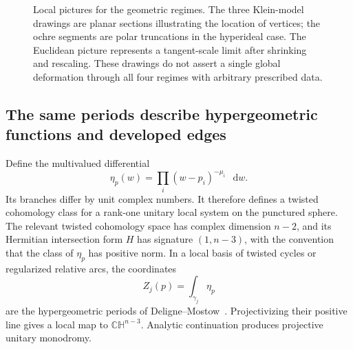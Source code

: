 \documentclass[11pt,a4paper]{article}
\numberwithin{equation}{section}
\theoremstyle{definition}
\theoremstyle{remark}
\newcommand{\dd}{\mathop{}\!\mathrm d}
\begin{document}
\begin{figure}[htbp]
\caption[Euclidean, compact, ideal, and hyperideal regimes]{Local pictures for the geometric regimes. The three Klein-model
drawings are planar sections illustrating the location of vertices;
the ochre segments are polar truncations in the hyperideal case.
The Euclidean picture represents a tangent-scale limit after shrinking
and rescaling. These drawings do not assert a single global deformation
through all four regimes with arbitrary prescribed data.}
\label{fig:mono-polyhedral-regimes}
\end{figure}

\subsection{The same periods describe hypergeometric functions and developed edges}

Define the multivalued differential
\begin{equation}
 \eta_p(w)=\prod_i(w-p_i)^{-\mu_i}\,\dd w.
 \label{eq:DMdifferential}
\end{equation}
Its branches differ by unit complex numbers. It therefore defines a
twisted cohomology class for a rank-one unitary local system on the
punctured sphere. The relevant twisted cohomology space has complex
dimension $n-2$, and its Hermitian intersection form $H$ has signature
$(1,n-3)$, with the convention that the class of $\eta_p$ has positive
norm. In a local basis of twisted cycles or regularized relative arcs,
the coordinates
\begin{equation}
 Z_j(p)=\int_{\gamma_j}\eta_p
 \label{eq:DMperiods}
\end{equation}
are the hypergeometric periods of Deligne--Mostow~\cite{DeligneMostow}.
Projectivizing their positive line gives a local map to
$\mathbb{CH}^{n-3}$. Analytic continuation produces projective unitary
monodromy.
\end{document}
